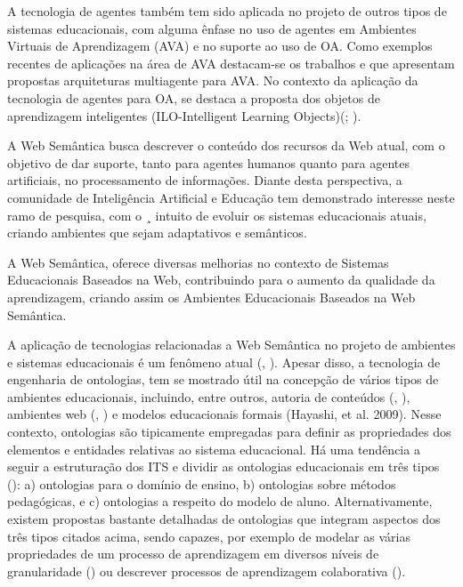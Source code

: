 \documentclass[12pt,journal,compsoc]{IEEEtran}
\begin{document}
A tecnologia de agentes também tem sido aplicada no projeto de outros tipos de sistemas educacionais, 
com alguma ênfase no uso de agentes em Ambientes Virtuais de Aprendizagem (AVA) e no suporte ao uso de OA. 
Como exemplos recentes de aplicações na área de AVA destacam-se os trabalhos \cite{Arias}  e \cite{Campana2008} que 
apresentam propostas arquiteturas multiagente para AVA. No contexto da aplicação da tecnologia de agentes para OA, 
se destaca a proposta dos objetos de aprendizagem inteligentes 
(ILO-Intelligent Learning Objects)(\cite{Gomes2004}; \cite{Bavaresco2009}).

A Web Semântica busca descrever o conteúdo dos recursos da Web atual, com o objetivo de dar suporte, 
tanto para agentes humanos quanto para agentes artificiais, no processamento de informações. 
Diante desta perspectiva, a comunidade de Inteligência Artificial e Educação tem demonstrado 
interesse neste ramo de pesquisa, com o ¸ intuito de evoluir os sistemas educacionais atuais,
criando ambientes que sejam adaptativos e semânticos.

A Web Semântica, oferece diversas melhorias no contexto de Sistemas Educacionais Baseados na Web, 
contribuindo para o aumento da qualidade da aprendizagem, criando assim os Ambientes Educacionais 
Baseados na Web Semântica.

A aplicação de tecnologias relacionadas a Web Semântica no projeto de ambientes e sistemas educacionais
é um fenômeno atual (\cite{Isotani}, \cite{Proceedings2007}). Apesar disso, a tecnologia de engenharia de ontologias, 
tem se mostrado útil na concepção de vários tipos de ambientes educacionais, incluindo, entre outros, autoria 
de conteúdos (\cite{Isotani}, \cite{Isotani2008}), ambientes web (\cite{Silva2009}, \cite{Bittencourt2009}) e 
modelos educacionais formais (Hayashi, et al. 2009). Nesse contexto, ontologias são tipicamente empregadas para 
definir as propriedades dos elementos e entidades relativas ao sistema educacional. Há uma tendência a seguir 
a estruturação dos ITS e dividir as ontologias educacionais em três tipos (\cite{Silva2009}): a) ontologias 
para o domínio de ensino, b) ontologias sobre métodos pedagógicas, e c) ontologias a respeito do modelo de aluno. 
Alternativamente, existem propostas bastante detalhadas de ontologias que integram aspectos dos três tipos citados acima, 
sendo capazes, por exemplo de modelar as várias propriedades de um processo de aprendizagem em diversos níveis de 
granularidade (\cite{Proceedings2007}) ou descrever processos de aprendizagem colaborativa (\cite{Hayashi2009}).
\end{document}
